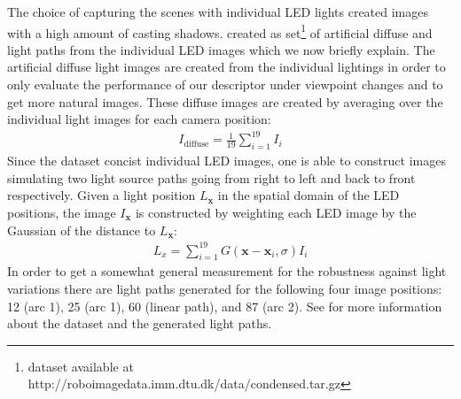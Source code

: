 \documentclass[thesis.tex]{subfiles}
\begin{document}
The choice of capturing the scenes with individual LED lights created images with a high amount of casting shadows. \citet{larsen2012jet} created as set\footnote{dataset available at http://roboimagedata.imm.dtu.dk/data/condensed.tar.gz} of artificial diffuse and light paths from the individual LED images which we now briefly explain. The artificial diffuse light images are created from the individual lightings in order to only evaluate the performance of our descriptor under viewpoint changes and to get more natural images. These diffuse images are created by averaging over the individual light images for each camera position:
\begin{align}
	I_{\text{diffuse}} = \frac{1}{19} \sum_{i = 1}^{19} I_{i}
\end{align}
Since the dataset concist individual LED images, one is able to construct images simulating two light source paths going from right to left and back to front respectively.
Given a light position $L_{\boldsymbol{x}}$ in the spatial domain of the LED positions, the image $I_{\boldsymbol{x}}$ is constructed by weighting each LED image by the Gaussian of the distance to $L_{\boldsymbol{x}}$:
\begin{align}
	L_{x} = \sum_{i = 1}^{19} G(\boldsymbol{x} - \boldsymbol{x}_i,\sigma) I_{i}
\end{align}
In order to get a somewhat general measurement for the robustness against light variations there are light paths generated for the following four image positions: 12 (arc 1), 25 (arc 1), 60 (linear path), and 87 (arc 2).
See \citet{aanaes2010recall,aanaes2010ground} for more information about the dataset and the generated light paths.
\end{document}
